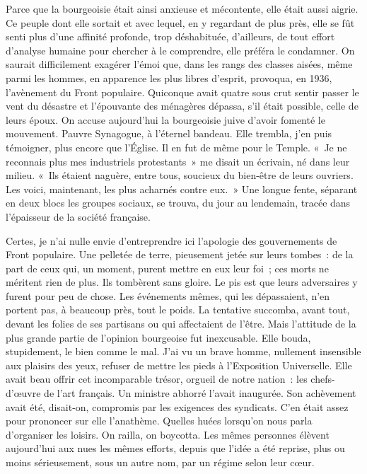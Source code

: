 \documentclass[french,twoside]{book} %
\begin{document}
Parce que la bourgeoisie était ainsi anxieuse et mécontente, elle était aussi aigrie. Ce peuple dont elle sortait et avec lequel, en y regardant de plus près, elle se fût senti plus d’une affinité profonde, trop déshabituée, d’ailleurs, de tout effort d’analyse humaine pour chercher à le comprendre, elle préféra le condamner. On saurait   difficilement exagérer l’émoi que, dans les rangs des classes aisées, même parmi les hommes, en apparence les plus libres d’esprit, provoqua, en 1936, l’avènement du Front populaire. Quiconque avait quatre sous crut sentir passer le vent du désastre et l’épouvante des ménagères dépassa, s’il était possible, celle de leurs époux. On accuse aujourd’hui la bourgeoisie juive d’avoir fomenté le mouvement. Pauvre Synagogue, à l’éternel bandeau. Elle trembla, j’en puis témoigner, plus encore que l’Église. Il en fut de même pour le Temple. « Je ne reconnais plus mes industriels protestants » me disait un écrivain, né dans leur milieu. « Ils étaient naguère, entre tous, soucieux du bien-être de leurs ouvriers. Les voici, maintenant, les plus acharnés contre eux. » Une longue fente, séparant en deux blocs les groupes sociaux, se trouva, du jour au lendemain, tracée dans l’épaisseur de la société française.\par
Certes, je n’ai nulle envie d’entreprendre ici l’apologie des gouvernements de Front populaire. Une pelletée de terre, pieusement jetée sur leurs tombes : de la part de ceux qui, un moment, purent mettre en eux leur foi ; ces morts ne méritent rien de plus. Ils tombèrent sans gloire. Le pis est que leurs adversaires y furent pour peu de chose. Les événements mêmes, qui les dépassaient, n’en portent pas, à beaucoup près, tout le poids. La tentative succomba, avant tout, devant les folies de ses partisans ou qui affectaient de l’être. Mais l’attitude de la plus grande partie de l’opinion bourgeoise fut inexcusable. Elle bouda, stupidement, le bien comme le mal. J’ai vu un brave homme, nullement insensible aux plaisirs des yeux, refuser de mettre les pieds à l’Exposition Universelle. Elle avait beau offrir cet incomparable trésor, orgueil de notre nation : les chefs-d’œuvre de l’art français. Un ministre abhorré l’avait inaugurée. Son achèvement avait été, disait-on, compromis par les exigences des syndicats. C’en était assez pour prononcer sur elle l’anathème. Quelles huées   lorsqu’on nous parla d’organiser les loisirs. On railla, on boycotta. Les mêmes personnes élèvent aujourd’hui aux nues les mêmes efforts, depuis que l’idée a été reprise, plus ou moins sérieusement, sous un autre nom, par un régime selon leur cœur.\par
\end{document}
